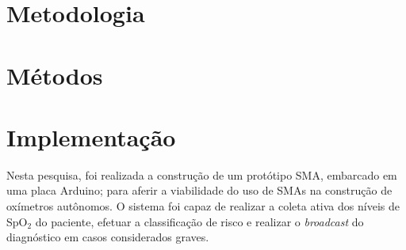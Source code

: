 

\section{Metodologia}\label{sec:metodology}


\section{Métodos}\label{sec:methods}



\section{Implementação}\label{sec:deployment}
Nesta pesquisa, foi realizada a construção de um protótipo SMA, embarcado em uma placa Arduino; para aferir a viabilidade do uso de SMAs na construção de oxímetros autônomos. O sistema foi capaz de realizar a coleta ativa dos níveis de SpO$_2$ do paciente, efetuar a classificação de risco e realizar o \textit{broadcast} do diagnóstico em casos considerados graves.


